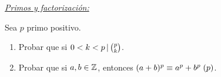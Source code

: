 \textit{\underline{Primos y factorización: }}

\ejercicio
\separadorCorto

\ejercicio
Sea $p$ primo positivo.
\begin{enumerate}[label=\roman*)]
	\item Probar que si $0 < k < p \, | \, \binom{p}{k}$.
	\item Probar que si $a, b \in \mathbb Z$, entonces $(a+b)^p \equiv a^p + b^p \;(p)$.
\end{enumerate}
\separadorCorto




